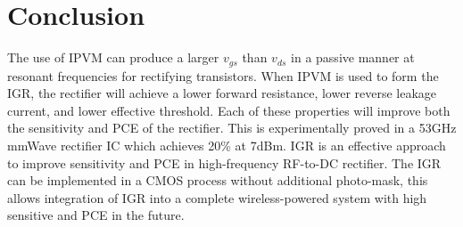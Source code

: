 \documentclass[bare_jrnl.tex]{subfiles}
\begin{document}
\section{Conclusion}
% 
% 
% 
% 


The use of IPVM can produce a larger $v_{gs}$ than $v_{ds}$ in a passive manner at resonant frequencies for rectifying transistors.  When IPVM is used to form the IGR, the rectifier will achieve a lower forward resistance, lower reverse leakage current, and lower effective threshold. Each of these properties will improve both the sensitivity and PCE of the rectifier. This is experimentally proved in a 53GHz mmWave rectifier IC which achieves 20\% at 7dBm. IGR is an effective approach to improve sensitivity and PCE in high-frequency RF-to-DC rectifier. The IGR can be implemented in a CMOS process without additional photo-mask, this allows integration of IGR into a complete wireless-powered system with high sensitive and PCE in the future.
\end{document}
